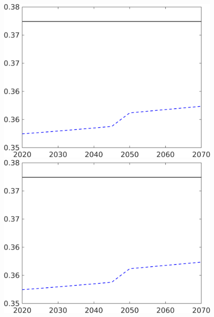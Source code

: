 \begin{figure}[h!!]
\begin{minipage}[]{0.32\textwidth}
	\end{minipage}
	\begin{minipage}[]{0.32\textwidth}
		\includegraphics[width=1\textwidth]{../../codding_model/own_basedOnFried/optimalPol_190722_tidiedUp/figures/all_10Aout22/CountTaul_modxgr_nsk_target_hh_spillover0_sep1_extern0_PV1_etaa0.79_lgd0.png}
	\end{minipage}
	\begin{minipage}[]{0.32\textwidth}
		\includegraphics[width=1\textwidth]{../../codding_model/own_basedOnFried/optimalPol_190722_tidiedUp/figures/all_10Aout22/CountTaul_modxgr_nsk_target_hh_spillover0_sep1_extern0_PV1_etaa0.79_lgd0.png}

\end{minipage}
\end{figure}
